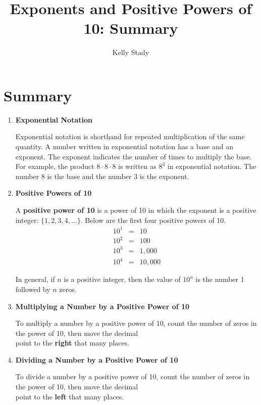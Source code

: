 \documentclass{ximera}
\title{Exponents and Positive Powers of 10: Summary}   %
\author{Kelly Stady}
\begin{document}
\begin{abstract}

\end{abstract}

\maketitle
\label{xim:ExponentsPowers10Summary}


\section*{Summary}

\normalsize
\begin{enumerate}
\item \textbf{Exponential Notation}

Exponential notation is shorthand for repeated multiplication of the same quantity.  A number written in exponential notation has a base and an exponent.  The exponent indicates the number of times to multiply the base.  For example, the product $8 \cdot 8 \cdot 8$ is written as $8^3$ in exponential notation.  The number 8 is the base and 
the number 3 is the exponent. 

\item \textbf{Positive Powers of 10}

A \textbf{positive power of 10} is a power of 10 in which the exponent is a positive integer: $\{1, 2, 3, 4, \ldots \}.$  Below are the first four positive powers of 10.
\begin{eqnarray*}
10^1 &=& 10 \\
10^2 &=& 100   \\
10^3 &=& 1,000 \\
10^4 &=& 10,000
\end{eqnarray*}

In general, if $n$ is a positive integer, then the value of $10^n$ is the number 1 followed by $n$ zeros.

\item \textbf{Multiplying a Number by a Positive Power of 10}

To multiply a number by a positive power of 10, count the number of zeros in the power of 10, then move the decimal \\ point to the \textbf{right} that many places.


\item \textbf{Dividing a Number by a Positive Power of 10}

To divide a number by a positive power of 10, count the number of zeros in the power of 10, then move the decimal \\ point to the \textbf{left} that many places.


\end{enumerate}
\end{document}
